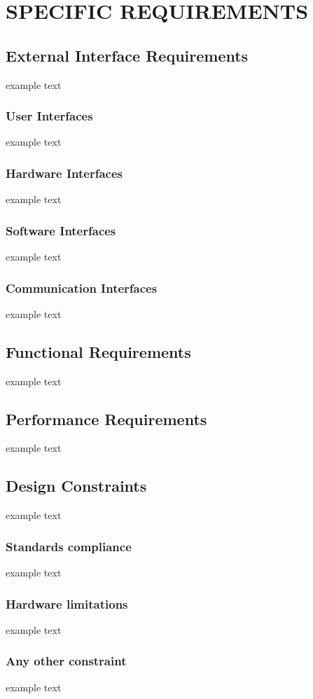 \section{SPECIFIC REQUIREMENTS}

\subsection{External Interface Requirements}
	example text
	
	\subsubsection{User	Interfaces}
		example text
	\subsubsection{Hardware	Interfaces}
		example text
	\subsubsection{Software	Interfaces}
		example text
	\subsubsection{Communication Interfaces}
		example text
		

\subsection{Functional Requirements}
	example text


\subsection{Performance	Requirements}
	example text
	

\subsection{Design Constraints}
	example text
	
	\subsubsection{Standards compliance}
		example text
	\subsubsection{Hardware	limitations}
		example text
	\subsubsection{Any other constraint}
		example text
		
